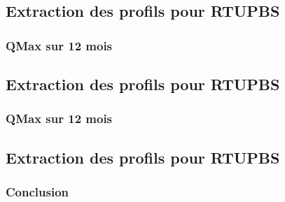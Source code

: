 \subsection{Extraction des profils pour RTUPBS}

\subsubsection{QMax sur 12 mois}


\subsection{Extraction des profils pour RTUPBS}

\subsubsection{QMax sur 12 mois}



\subsection{Extraction des profils pour RTUPBS}

\subsubsection{Conclusion}